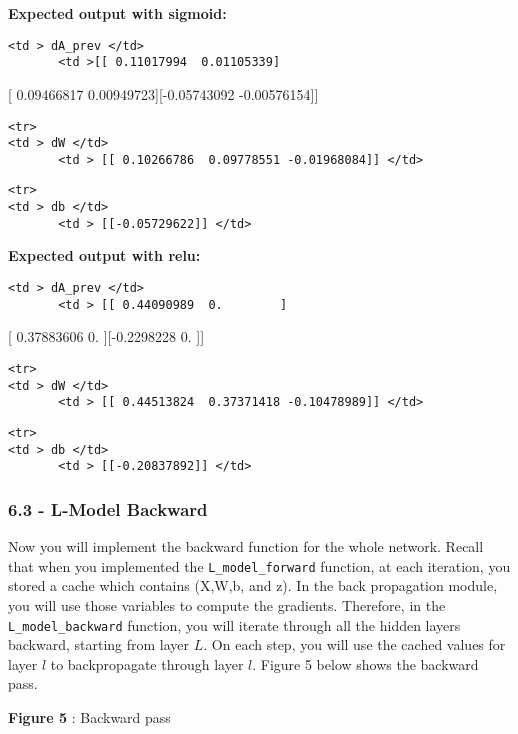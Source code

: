 \documentclass[11pt]{article}
\begin{document}
    \textbf{Expected output with sigmoid:}

\begin{verbatim}
<td > dA_prev </td> 
       <td >[[ 0.11017994  0.01105339]
\end{verbatim}

{[} 0.09466817 0.00949723{]}{[}-0.05743092 -0.00576154{]}{]}

\begin{verbatim}
<tr>
<td > dW </td> 
       <td > [[ 0.10266786  0.09778551 -0.01968084]] </td> 
\end{verbatim}

\begin{verbatim}
<tr>
<td > db </td> 
       <td > [[-0.05729622]] </td> 
\end{verbatim}

    \textbf{Expected output with relu:}

\begin{verbatim}
<td > dA_prev </td> 
       <td > [[ 0.44090989  0.        ]
\end{verbatim}

{[} 0.37883606 0. {]}{[}-0.2298228 0. {]}{]}

\begin{verbatim}
<tr>
<td > dW </td> 
       <td > [[ 0.44513824  0.37371418 -0.10478989]] </td> 
\end{verbatim}

\begin{verbatim}
<tr>
<td > db </td> 
       <td > [[-0.20837892]] </td> 
\end{verbatim}

    \subsubsection{6.3 - L-Model Backward}\label{l-model-backward}

Now you will implement the backward function for the whole network.
Recall that when you implemented the \texttt{L\_model\_forward}
function, at each iteration, you stored a cache which contains (X,W,b,
and z). In the back propagation module, you will use those variables to
compute the gradients. Therefore, in the \texttt{L\_model\_backward}
function, you will iterate through all the hidden layers backward,
starting from layer \(L\). On each step, you will use the cached values
for layer \(l\) to backpropagate through layer \(l\). Figure 5 below
shows the backward pass.

\textbf{Figure 5} : Backward pass
\end{document}
